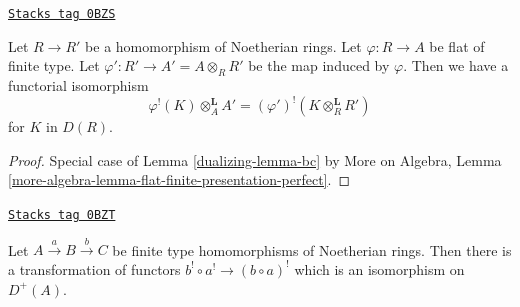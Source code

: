 \begin{lemma}[Bc flat]
\label{dualizing-lemma-bc-flat}
\href{https://stacks.math.columbia.edu/tag/0BZS}{\texttt{Stacks tag 0BZS}}

Let $R \to R'$ be a homomorphism of Noetherian rings.
Let $\varphi : R \to A$ be flat of finite type.
Let $\varphi' : R' \to A' = A \otimes_R R'$ be the map induced by $\varphi$.
Then we have a functorial isomorphism
$$
\varphi^!(K) \otimes_A^\mathbf{L} A' =
(\varphi')^!(K \otimes_R^\mathbf{L} R')
$$
for $K$ in $D(R)$.
\end{lemma}

\begin{proof}

Special case of Lemma \ref{dualizing-lemma-bc} by
More on Algebra, Lemma
\ref{more-algebra-lemma-flat-finite-presentation-perfect}.
\end{proof}

\begin{lemma}
\label{dualizing-lemma-composition-shriek-algebraic}
\href{https://stacks.math.columbia.edu/tag/0BZT}{\texttt{Stacks tag 0BZT}}

Let $A \xrightarrow{a} B \xrightarrow{b} C$ be finite type homomorphisms of
Noetherian rings. Then there is a transformation of functors
$b^! \circ a^! \to (b \circ a)^!$ which is an isomorphism on $D^+(A)$.
\end{lemma}

